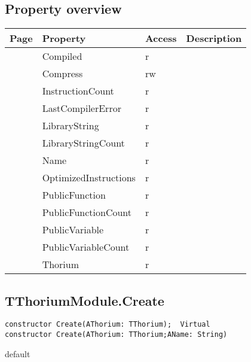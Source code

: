 \subsection{Property overview}
\label{thoriumcore:thorium:tthoriummodule:properties}
\begin{tabularx}{\textwidth}{lllX}
Page & Property & Access & Description \\ \hline
\pageref{thoriumcore:thorium:tthoriummodule:compiled} & Compiled & r &  \\
\pageref{thoriumcore:thorium:tthoriummodule:compress} & Compress & rw &  \\
\pageref{thoriumcore:thorium:tthoriummodule:instructioncount} & InstructionCount & r &  \\
\pageref{thoriumcore:thorium:tthoriummodule:lastcompilererror} & LastCompilerError & r &  \\
\pageref{thoriumcore:thorium:tthoriummodule:librarystring} & LibraryString & r &  \\
\pageref{thoriumcore:thorium:tthoriummodule:librarystringcount} & LibraryStringCount & r &  \\
\pageref{thoriumcore:thorium:tthoriummodule:name} & Name & r &  \\
\pageref{thoriumcore:thorium:tthoriummodule:optimizedinstructions} & OptimizedInstructions & r &  \\
\pageref{thoriumcore:thorium:tthoriummodule:publicfunction} & PublicFunction & r &  \\
\pageref{thoriumcore:thorium:tthoriummodule:publicfunctioncount} & PublicFunctionCount & r &  \\
\pageref{thoriumcore:thorium:tthoriummodule:publicvariable} & PublicVariable & r &  \\
\pageref{thoriumcore:thorium:tthoriummodule:publicvariablecount} & PublicVariableCount & r &  \\
\pageref{thoriumcore:thorium:tthoriummodule:thorium} & Thorium & r &  \\
\hline
\end{tabularx}
\subsection{TThoriumModule.Create}
\label{thoriumcore:thorium:tthoriummodule:create}
\begin{FPCList}
\Synopsis
\Declaration 

\begin{verbatim}
constructor Create(AThorium: TThorium);  Virtual
constructor Create(AThorium: TThorium;AName: String)
\end{verbatim}
\Visibility
default
\Description
\Errors
\end{FPCList}
